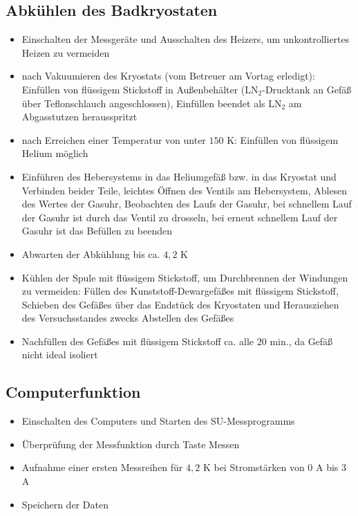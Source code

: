 \documentclass[german,  %
parskip=full,  %
]{scrartcl}
\begin{document}
\subsection{Abkühlen des Badkryostaten}
\begin{itemize}
\item Einschalten der Messgeräte und Ausschalten des Heizers, um unkontrolliertes Heizen zu vermeiden
\item nach Vakuumieren des Kryostats (vom Betreuer am Vortag erledigt): Einfüllen von flüssigem Stickstoff in Außenbehälter (LN$_{2}$-Drucktank an Gefäß über Teflonschlauch angeschlossen), Einfüllen beendet als LN$_{2}$ am Abgasstutzen herausspritzt
\item nach Erreichen einer Temperatur von unter $150$ K: Einfüllen von flüssigem Helium möglich
\item Einführen des Hebersystems in das Heliumgefäß bzw. in das Kryostat und Verbinden beider Teile, leichtes Öffnen des Ventils am Hebersystem, Ablesen des Wertes der Gasuhr, Beobachten des Laufs der Gasuhr, bei schnellem Lauf der Gasuhr ist durch das Ventil zu drosseln, bei erneut schnellem Lauf der Gasuhr ist das Befüllen zu beenden
\item Abwarten der Abkühlung bis ca. $4,2$ K
\item Kühlen der Spule mit flüssigem Stickstoff, um Durchbrennen der Windungen zu vermeiden: Füllen des Kunststoff-Dewargefäßes mit flüssigem Stickstoff, Schieben des Gefäßes über das Endstück des Kryostaten und Herausziehen des Versuchsstandes zwecks Abstellen des Gefäßes
\item Nachfüllen des Gefäßes mit flüssigem Stickstoff ca. alle $20$ min., da Gefäß nicht ideal isoliert
\end{itemize}

\subsection{Computerfunktion}
\begin{itemize}
\item Einschalten des Computers und Starten des SU-Messprogramms
\item Überprüfung der Messfunktion durch Taste Messen
\item Aufnahme einer ersten Messreihen für $4,2$ K bei Stromstärken von $0$ A bis $3$ A
\item Speichern der Daten
\end{itemize}
\end{document}
